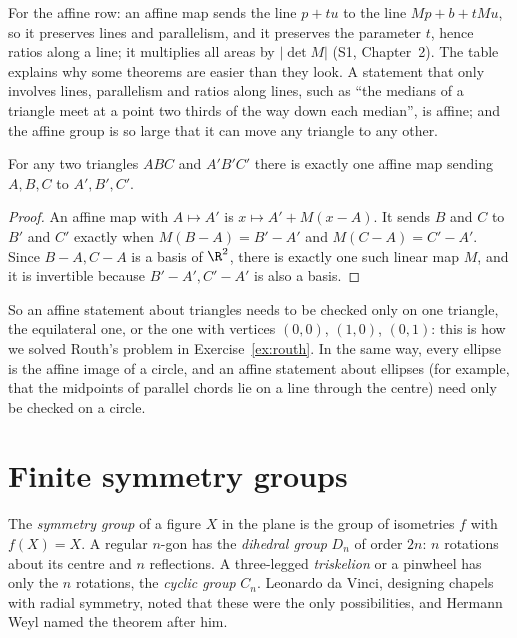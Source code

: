 For the affine row: an affine map sends the line $p+tu$ to the line $Mp+b+tMu$, so it preserves lines and parallelism, and it
preserves the parameter $t$, hence ratios along a line; it multiplies all areas by $|\det M|$ (S1, Chapter~2). The table explains why
some theorems are easier than they look. A statement that only involves lines, parallelism and ratios along lines, such as ``the
medians of a triangle meet at a point two thirds of the way down each median'', is affine; and the affine group is so large that it
can move any triangle to any other.

\begin{proposition}\label{prop:affinetriangles}
For any two triangles $ABC$ and $A'B'C'$ there is exactly one affine map sending $A,B,C$ to $A',B',C'$.
\end{proposition}
\begin{proof}
An affine map with $A\mapsto A'$ is $x\mapsto A'+M(x-A)$. It sends $B$ and $C$ to $B'$ and $C'$ exactly when $M(B-A)=B'-A'$ and
$M(C-A)=C'-A'$. Since $B-A,C-A$ is a basis of $\R^2$, there is exactly one such linear map $M$, and it is invertible because
$B'-A',C'-A'$ is also a basis.
\end{proof}

So an affine statement about triangles needs to be checked only on one triangle, the equilateral one, or the one with vertices $(0,0)$,
$(1,0)$, $(0,1)$: this is how we solved Routh's problem in Exercise~\ref{ex:routh}. In the same way, every ellipse is the affine image of a
circle, and an affine statement about ellipses (for example, that the midpoints of parallel chords lie on a line through the centre)
need only be checked on a circle.

\section{Finite symmetry groups}

The \emph{symmetry group} of a figure $X$ in the plane is the group of isometries $f$ with $f(X)=X$. A regular $n$-gon has the
\emph{dihedral group} $D_n$ of order $2n$: $n$ rotations about its centre and $n$ reflections. A three-legged
\emph{triskelion} or a pinwheel has only the $n$ rotations, the \emph{cyclic group} $C_n$. Leonardo da Vinci, designing chapels with
radial symmetry, noted that these were the only possibilities, and Hermann Weyl named the theorem after him.

